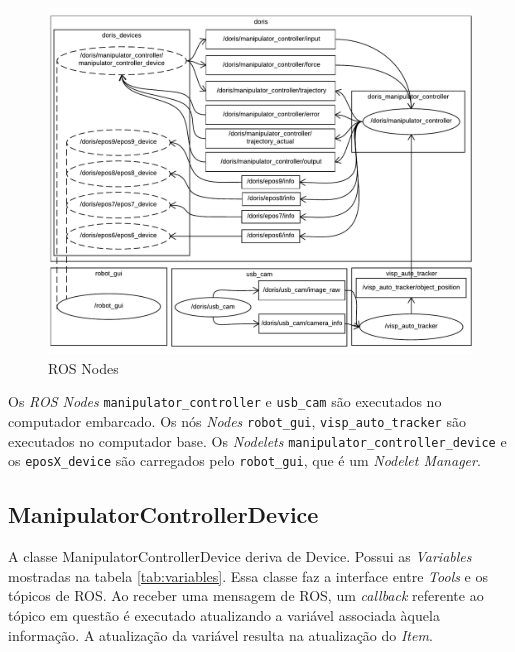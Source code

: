 \begin{figure}[!h]
  \centering
  \includegraphics[width=\linewidth]{./img/node_diagram}
  \caption{ROS Nodes}
  \label{fig:ros_nodes}
\end{figure}

Os \textit{ROS Nodes} \verb|manipulator_controller| e \verb|usb_cam| são executados no computador embarcado. Os nós \textit{Nodes} \verb|robot_gui|, \verb|visp_auto_tracker| são executados no computador base. Os \textit{Nodelets} \verb|manipulator_controller_device| e os \verb|eposX_device| são carregados pelo \verb|robot_gui|, que é um \textit{Nodelet Manager}. 

\subsection{ManipulatorControllerDevice}

A classe ManipulatorControllerDevice deriva de Device. Possui as \textit{Variables} mostradas na tabela \ref{tab:variables}. Essa classe faz a interface entre \textit{Tools} e os tópicos de ROS. Ao receber uma mensagem de ROS, um \textit{callback} referente ao tópico em questão é executado atualizando a variável associada àquela informação. A atualização da variável resulta na atualização do \textit{Item}.

